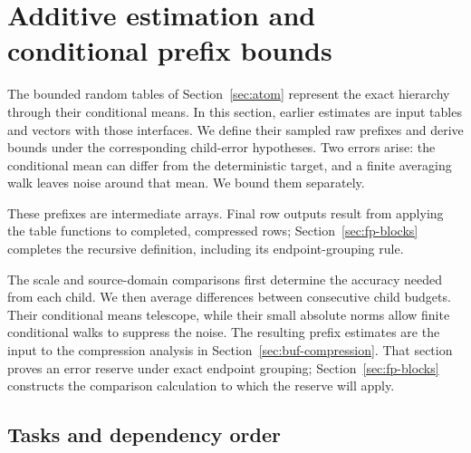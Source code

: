 \section{Additive estimation and conditional prefix bounds}
\label{sec:est}

The bounded random tables of Section~\ref{sec:atom} represent the exact
hierarchy through their conditional means.  In this section, earlier
estimates are input tables and vectors with those interfaces.  We define
their sampled raw prefixes and derive bounds under the corresponding
child-error hypotheses.  Two errors arise: the conditional mean can differ
from the deterministic target, and a finite averaging walk leaves noise
around that mean.  We bound them separately.

These prefixes are intermediate arrays.  Final row outputs result from
applying the table functions to completed, compressed rows;
Section~\ref{sec:fp-blocks} completes the recursive definition, including
its endpoint-grouping rule.

The scale and source-domain comparisons first determine the accuracy needed
from each child.  We then average differences between consecutive child
budgets.  Their conditional means telescope, while their small absolute
norms allow finite conditional walks to suppress the noise.  The resulting
prefix estimates are the input to the compression analysis in
Section~\ref{sec:buf-compression}.  That section proves an error reserve
under exact endpoint grouping; Section~\ref{sec:fp-blocks} constructs the
comparison calculation to which the reserve will apply.

\subsection{Tasks and dependency order}
\label{subsec:est-tasks}

